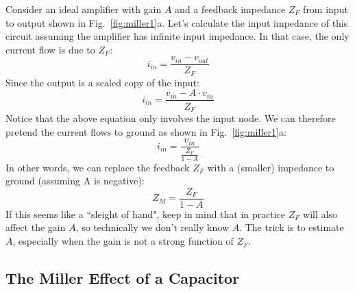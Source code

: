 Consider an ideal amplifier with gain $A$ and a feedback impedance $Z_F$ from input to output shown in Fig.~\ref{fig:miller1}a.  Let's calculate the input impedance of this circuit assuming the amplifier has infinite input impedance.  In that case, the only current flow is due to $Z_F$:
%
\begin{equation}
	i_{in} = \frac{v_{in} - v_{out}}{Z_F}
\end{equation}
%
Since the output is a scaled copy of the input:
%
\begin{equation}
	i_{in} = \frac{ v_{in} - A\cdot v_{in} }{Z_F}
\end{equation}
%
Notice that the above equation only involves the input node.  We can therefore pretend the current flows to ground as shown in Fig.~\ref{fig:miller1}a:
%
\begin{equation}
	i_{in} = \frac{v_{in}}{\frac{Z_F}{1 - A}}
\end{equation}
% 
In other words, we can replace the feedback $Z_F$ with a (smaller) impedance to ground (assuming A is negative):
%
\begin{equation}
	Z_M = \frac{Z_F}{1 - A}
\end{equation}
%
If this seems like a ``sleight of hand", keep in mind that in practice $Z_F$ will also affect the gain $A$, so technically we don't really know $A$. The trick is to estimate $A$, especially when the gain is not a strong function of $Z_F$.



\subsection{The Miller Effect of a Capacitor}

